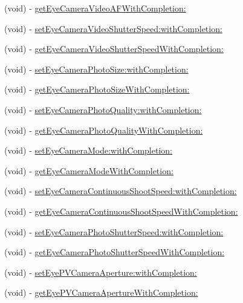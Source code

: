 \begin{DoxyCompactItemize}
(void) -\/ \hyperlink{interface_p_v_camera_a80b5e84ff542ff2258424319034e8929}{get\+Eye\+Camera\+Video\+A\+F\+With\+Completion\+:}
\item 
(void) -\/ \hyperlink{interface_p_v_camera_adb18da43aad108990528a3a56bb0cd13}{set\+Eye\+Camera\+Video\+Shutter\+Speed\+:with\+Completion\+:}
\item 
(void) -\/ \hyperlink{interface_p_v_camera_a56785f881bffc7ecf9d1a2824b2cc818}{get\+Eye\+Camera\+Video\+Shutter\+Speed\+With\+Completion\+:}
\item 
(void) -\/ \hyperlink{interface_p_v_camera_a6ffba1f6705e5bec4023b843e7e0d6d1}{set\+Eye\+Camera\+Photo\+Size\+:with\+Completion\+:}
\item 
(void) -\/ \hyperlink{interface_p_v_camera_ad9e7476572492aade9c9e124dbbefbca}{get\+Eye\+Camera\+Photo\+Size\+With\+Completion\+:}
\item 
(void) -\/ \hyperlink{interface_p_v_camera_a42a0725334b3b2716d0ef349f50b5a46}{set\+Eye\+Camera\+Photo\+Quality\+:with\+Completion\+:}
\item 
(void) -\/ \hyperlink{interface_p_v_camera_a91474a4ded096681ac9b787cd87db98b}{get\+Eye\+Camera\+Photo\+Quality\+With\+Completion\+:}
\item 
(void) -\/ \hyperlink{interface_p_v_camera_a6825cd775ec04a27772a7f7c559d6dce}{set\+Eye\+Camera\+Mode\+:with\+Completion\+:}
\item 
(void) -\/ \hyperlink{interface_p_v_camera_a56f58cce05dda8ec299c4bdf0d19fcc1}{get\+Eye\+Camera\+Mode\+With\+Completion\+:}
\item 
(void) -\/ \hyperlink{interface_p_v_camera_a48df0e917a7f559200c6855cd95857aa}{set\+Eye\+Camera\+Continuous\+Shoot\+Speed\+:with\+Completion\+:}
\item 
(void) -\/ \hyperlink{interface_p_v_camera_a57c31eca4c7f48c0a9b422d2193640fe}{get\+Eye\+Camera\+Continuous\+Shoot\+Speed\+With\+Completion\+:}
\item 
(void) -\/ \hyperlink{interface_p_v_camera_a6b9e71327e59de9094258f617141b138}{set\+Eye\+Camera\+Photo\+Shutter\+Speed\+:with\+Completion\+:}
\item 
(void) -\/ \hyperlink{interface_p_v_camera_a28e7682886ebf5f88cbf96df972b3cce}{get\+Eye\+Camera\+Photo\+Shutter\+Speed\+With\+Completion\+:}
\item 
(void) -\/ \hyperlink{interface_p_v_camera_af74626ebd2f1f2dc16f7acd6d3fb0a6b}{set\+Eye\+P\+V\+Camera\+Aperture\+:with\+Completion\+:}
\item 
(void) -\/ \hyperlink{interface_p_v_camera_a537a827fa162853c04b22aee72f2e295}{get\+Eye\+P\+V\+Camera\+Aperture\+With\+Completion\+:}

\end{DoxyCompactItemize}
